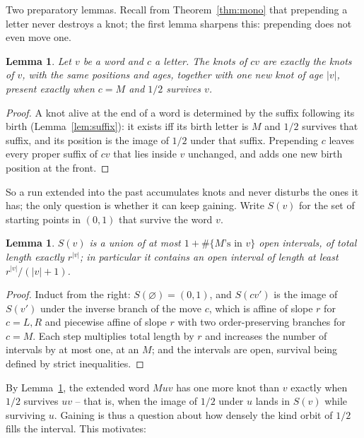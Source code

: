 \documentclass[11pt,reqno]{amsart}
\theoremstyle{plain}
\newtheorem{lemma}[theorem]{Lemma}
\theoremstyle{definition}
\theoremstyle{remark}
\begin{document}
Two preparatory lemmas. Recall from Theorem~\ref{thm:mono} that prepending a
letter never destroys a knot; the first lemma sharpens this: prepending does
not even move one.

\begin{lemma}\label{lem:permanent}
Let $v$ be a word and $c$ a letter. The knots of $cv$ are exactly the knots of
$v$, with the same positions and ages, together with one new knot of age
$|v|$, present exactly when $c=M$ and $1/2$ survives $v$.
\end{lemma}

\begin{proof}
A knot alive at the end of a word is determined by the suffix following its
birth (Lemma~\ref{lem:suffix}): it exists iff its birth letter is $M$ and
$1/2$ survives that suffix, and its position is the image of $1/2$ under that
suffix. Prepending $c$ leaves every proper suffix of $cv$ that lies inside $v$
unchanged, and adds one new birth position at the front.
\end{proof}

So a run extended into the past accumulates knots and never disturbs the ones
it has; the only question is whether it can keep gaining. Write $S(v)$ for the
set of starting points in $(0,1)$ that survive the word $v$.

\begin{lemma}\label{lem:survivorset}
$S(v)$ is a union of at most $1+\#\{M\text{'s in }v\}$ open intervals, of
total length exactly $r^{|v|}$; in particular it contains an open interval of
length at least $r^{|v|}/(|v|+1)$.
\end{lemma}

\begin{proof}
Induct from the right: $S(\varnothing)=(0,1)$, and $S(cv')$ is the image of
$S(v')$ under the inverse branch of the move $c$, which is affine of slope $r$
for $c=L,R$ and piecewise affine of slope $r$ with two order-preserving
branches for $c=M$. Each step multiplies total length by $r$ and increases the
number of intervals by at most one, at an $M$; and the intervals are open,
survival being defined by strict inequalities.
\end{proof}

By Lemma~\ref{lem:permanent}, the extended word $Muv$ has one more knot than
$v$ exactly when $1/2$ survives $uv$ -- that is, when the image of $1/2$ under
$u$ lands in $S(v)$ while surviving $u$. Gaining is thus a question about how
densely the kind orbit of $1/2$ fills the interval. This motivates:
\end{document}
